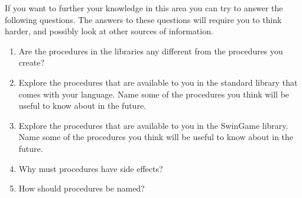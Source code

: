 \bigskip
If you want to further your knowledge in this area you can try to answer the following questions. The answers to these questions will require you to think harder, and possibly look at other sources of information.
\begin{enumerate}
  \item Are the procedures in the libraries any different from the procedures you create?
  \item Explore the procedures that are available to you in the standard library that comes with your language. Name some of the procedures you think will be useful to know about in the future.
  \item Explore the procedures that are available to you in the SwinGame library. Name some of the procedures you think will be useful to know about in the future.
  \item Why must procedures have side effects?
  \item How should procedures be named?
\end{enumerate}

